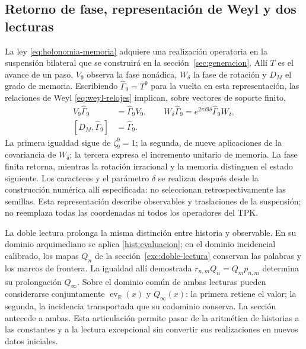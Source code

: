 \subsection{Retorno de fase, representación de Weyl y dos lecturas}
\label{hist:puente-lecturas}

La ley \eqref{eq:holonomia-memoria} adquiere una realización operatoria
en la suspensión bilateral que se construirá en la
sección~\ref{sec:generacion}. Allí \(T\) es el avance de un paso,
\(V_9\) observa la fase nonádica, \(W_\delta\) la fase de rotación y
\(D_M\) el grado de memoria. Escribiendo
\(\widehat\Gamma_9=T^9\) para la vuelta en esta representación,
las relaciones de Weyl \eqref{eq:weyl-relojes} implican, sobre vectores
de soporte finito,
\begin{equation}
 \begin{aligned}
 V_9\widehat\Gamma_9&=\widehat\Gamma_9V_9,\qquad
 W_\delta\widehat\Gamma_9=e^{2\pi i9\delta}
     \widehat\Gamma_9W_\delta,\\
 [D_M,\widehat\Gamma_9]&=\widehat\Gamma_9.
 \end{aligned}
 \label{hist:tres-retornos}
\end{equation}
La primera igualdad sigue de \(\zeta_9^9=1\); la segunda, de nueve
aplicaciones de la covariancia de \(W_\delta\); la tercera expresa
el incremento unitario de memoria. La fase finita retorna, mientras la
rotación irracional y la memoria distinguen el estado siguiente. Los
caracteres y el parámetro \(\delta\) se realizan después desde la
construcción numérica allí especificada: no seleccionan retrospectivamente
las semillas. Esta representación describe observables y traslaciones de
la suspensión; no reemplaza todas las coordenadas ni todos los operadores
del TPK.

La doble lectura prolonga la misma distinción entre historia y observable.
En su dominio arquimediano se aplica \eqref{hist:evaluacion}; en el
dominio incidencial calibrado, los mapas \(Q_n\) de la
sección~\ref{exc:doble-lectura} conservan las palabras y los marcos de
frontera. La igualdad allí demostrada
\(r_{n,m}Q_n=Q_mp_{n,m}\) determina su prolongación \(Q_\infty\).
Sobre el dominio común de ambas lecturas pueden considerarse conjuntamente
\(\operatorname{ev}_{\mathbb R}(x)\) y \(Q_\infty(x)\): la
primera retiene el valor; la segunda, la incidencia transportada que su
codominio conserva. La sección antecede a ambas. Esta articulación permite
pasar de la aritmética de historias a las constantes y a la lectura
excepcional sin convertir sus realizaciones en nuevos datos iniciales.

